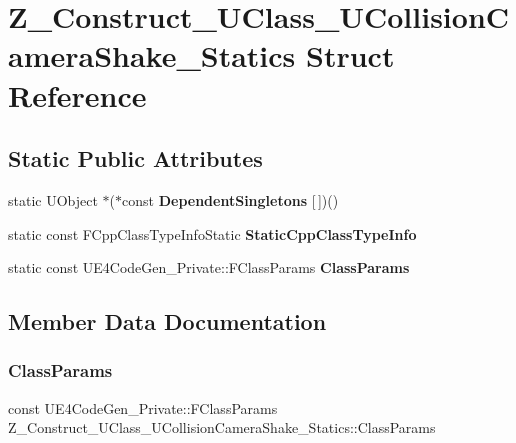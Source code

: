 \hypertarget{struct_z___construct___u_class___u_collision_camera_shake___statics}{}\section{Z\+\_\+\+Construct\+\_\+\+U\+Class\+\_\+\+U\+Collision\+Camera\+Shake\+\_\+\+Statics Struct Reference}
\label{struct_z___construct___u_class___u_collision_camera_shake___statics}
\subsection*{Static Public Attributes}
\begin{DoxyCompactItemize}
\item 
\mbox{\label{struct_z___construct___u_class___u_collision_camera_shake___statics_a9aeea4e02147e6d56966ecf21335d264}} 
static U\+Object $\ast$($\ast$const {\bfseries Dependent\+Singletons} \mbox{[}$\,$\mbox{]})()
\item 
static const F\+Cpp\+Class\+Type\+Info\+Static {\bfseries Static\+Cpp\+Class\+Type\+Info}
\item 
static const U\+E4\+Code\+Gen\+\_\+\+Private\+::\+F\+Class\+Params {\bfseries Class\+Params}
\end{DoxyCompactItemize}


\subsection{Member Data Documentation}
\mbox{\label{struct_z___construct___u_class___u_collision_camera_shake___statics_a8b1b7ccb66c8381cfc7ceb56d0aa98b2}} 
\subsubsection{\texorpdfstring{ClassParams}{ClassParams}}
{\footnotesize\ttfamily const U\+E4\+Code\+Gen\+\_\+\+Private\+::\+F\+Class\+Params Z\+\_\+\+Construct\+\_\+\+U\+Class\+\_\+\+U\+Collision\+Camera\+Shake\+\_\+\+Statics\+::\+Class\+Params\hspace{0.3cm}{\ttfamily [static]}}

